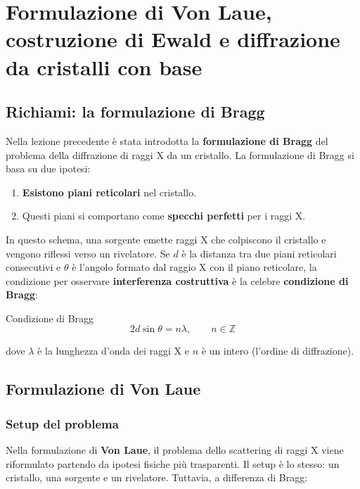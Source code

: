 \chapter{Formulazione di Von Laue, costruzione di Ewald e diffrazione da cristalli con base}


\section{Richiami: la formulazione di Bragg}

Nella lezione precedente è stata introdotta la \textbf{formulazione di Bragg} del problema della diffrazione di raggi X da un cristallo. La formulazione di Bragg si basa su due ipotesi:

\begin{enumerate}
    \item \textbf{Esistono piani reticolari} nel cristallo.
    \item Questi piani si comportano come \textbf{specchi perfetti} per i raggi X.
\end{enumerate}

In questo schema, una sorgente emette raggi X che colpiscono il cristallo e vengono riflessi verso un rivelatore. Se $d$ è la distanza tra due piani reticolari consecutivi e $\theta$ è l'angolo formato dal raggio X con il piano reticolare, la condizione per osservare \textbf{interferenza costruttiva} è la celebre \textbf{condizione di Bragg}:

\begin{equazione}{Condizione di Bragg}
\begin{equation}
2d\sin\theta = n\lambda, \qquad n \in \mathbb{Z}
\end{equation}
\end{equazione}

dove $\lambda$ è la lunghezza d'onda dei raggi X e $n$ è un intero (l'ordine di diffrazione).

\section{Formulazione di Von Laue}

\subsection*{Setup del problema}

Nella formulazione di \textbf{Von Laue}, il problema dello scattering di raggi X viene riformulato partendo da ipotesi fisiche più trasparenti. Il setup è lo stesso: un cristallo, una sorgente e un rivelatore. Tuttavia, a differenza di Bragg:

